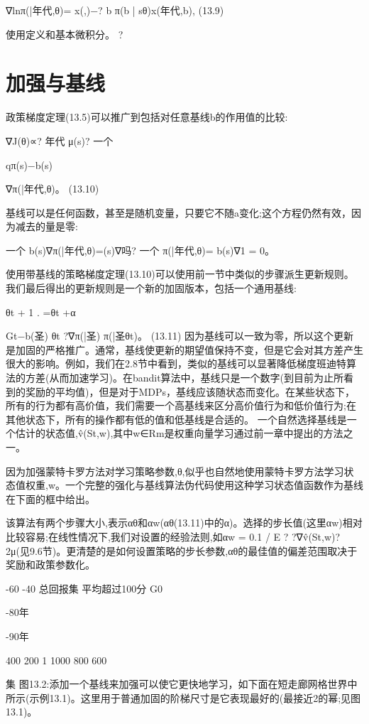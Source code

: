 ∇lnπ(|年代,θ)= x(,)−?
b
π(b | sθ)x(年代,b), 					(13.9)

使用定义和基本微积分。 					?


\section{加强与基线}

政策梯度定理(13.5)可以推广到包括对任意基线b的作用值的比较:

∇J(θ)∝?
年代
μ(s)?
一个

qπ(s)−b(s)

∇π(|年代,θ)。 					(13.10)

基线可以是任何函数，甚至是随机变量，只要它不随a变化;这个方程仍然有效，因为减去的量是零:

一个
b(s)∇π(|年代,θ)=(s)∇吗?
一个
π(|年代,θ)= b(s)∇1 = 0。

使用带基线的策略梯度定理(13.10)可以使用前一节中类似的步骤派生更新规则。我们最后得出的更新规则是一个新的加固版本，包括一个通用基线:

θt + 1
.
=θt +α

Gt−b(圣)
θt ?∇π(|圣)
π(|圣θt)。 					(13.11)
因为基线可以一致为零，所以这个更新是加固的严格推广。通常，基线使更新的期望值保持不变，但是它会对其方差产生很大的影响。例如，我们在2.8节中看到，类似的基线可以显著降低梯度班迪特算法的方差(从而加速学习)。在bandit算法中，基线只是一个数字(到目前为止所看到的奖励的平均值)，但是对于MDPs，基线应该随状态而变化。在某些状态下，所有的行为都有高价值，我们需要一个高基线来区分高价值行为和低价值行为;在其他状态下，所有的操作都有低的值和低基线是合适的。
一个自然选择基线是一个估计的状态值,v̂(St,w),其中w∈Rm是权重向量学习通过前一章中提出的方法之一。

因为加强蒙特卡罗方法对学习策略参数,θ,似乎也自然地使用蒙特卡罗方法学习状态值权重,w。一个完整的强化与基线算法伪代码使用这种学习状态值函数作为基线在下面的框中给出。
 

该算法有两个步骤大小,表示αθ和αw(αθ(13.11)中的α)。选择的步长值(这里αw)相对比较容易;在线性情况下,我们对设置的经验法则,如αw = 0.1 / E ? ?∇v̂(St,w)?2μ(见9.6节)。更清楚的是如何设置策略的步长参数,αθ的最佳值的偏差范围取决于奖励和政策参数化。
 
-60 -40
总回报集
平均超过100分
G0



-80年


-90年

400 200 1
1000 800 600

集
图13.2:添加一个基线来加强可以使它更快地学习，如下面在短走廊网格世界中所示(示例13.1)。这里用于普通加固的阶梯尺寸是它表现最好的(最接近2的幂;见图13.1)。

